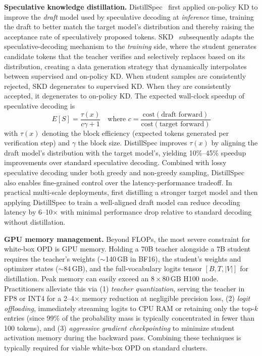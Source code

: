 \documentclass{article} %
\begin{document}
\textbf{Speculative knowledge distillation.} DistillSpec~\citep{2310.08461} first applied on-policy KD to improve the \emph{draft} model used by speculative decoding at \emph{inference} time, training the draft to better match the target model's distribution and thereby raising the acceptance rate of speculatively proposed tokens. SKD~\citep{2410.11325} subsequently adapts the speculative-decoding mechanism to the \emph{training} side, where the student generates candidate tokens that the teacher verifies and selectively replaces based on its distribution, creating a data generation strategy that dynamically interpolates between supervised and on-policy KD. When student samples are consistently rejected, SKD degenerates to supervised KD. When they are consistently accepted, it degenerates to on-policy KD. The expected wall-clock speedup of speculative decoding is
\begin{equation*}
    E[S] = \frac{\tau(x)}{c\gamma + 1} \quad \text{where } c = \frac{\text{cost}(\text{draft forward})}{\text{cost}(\text{target forward})}
\end{equation*}
with $\tau(x)$ denoting the block efficiency (expected tokens generated per verification step) and $\gamma$ the block size. DistillSpec improves $\tau(x)$ by aligning the draft model's distribution with the target model's, yielding 10\%--45\% speedup improvements over standard speculative decoding. Combined with lossy speculative decoding under both greedy and non-greedy sampling, DistillSpec also enables fine-grained control over the latency-performance tradeoff. In practical multi-scale deployments, first distilling a stronger target model and then applying DistillSpec to train a well-aligned draft model can reduce decoding latency by 6--10$\times$ with minimal performance drop relative to standard decoding without distillation.

\textbf{GPU memory management.} Beyond FLOPs, the most severe constraint for white-box OPD is GPU memory. Holding a 70B teacher alongside a 7B student requires the teacher's weights ($\sim$140\,GB in BF16), the student's weights and optimizer states ($\sim$84\,GB), and the full-vocabulary logits tensor $[B, T, |V|]$ for distillation. Peak memory can easily exceed an $8\times80$\,GB H100 node. Practitioners alleviate this via (1) \textit{teacher quantization}, serving the teacher in FP8 or INT4 for a 2--4$\times$ memory reduction at negligible precision loss, (2) \textit{logit offloading}, immediately streaming logits to CPU RAM or retaining only the top-$k$ entries (since 99\% of the probability mass is typically concentrated in fewer than 100 tokens), and (3) \textit{aggressive gradient checkpointing} to minimize student activation memory during the backward pass. Combining these techniques is typically required for viable white-box OPD on standard clusters.
\end{document}

